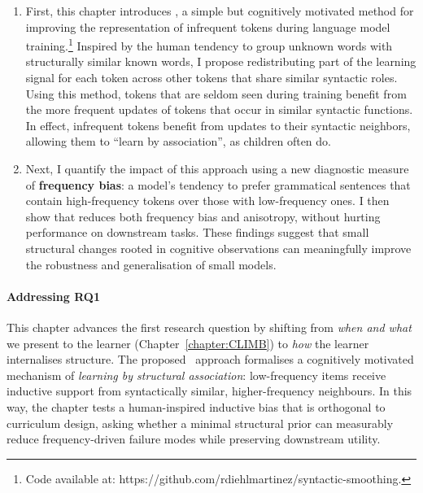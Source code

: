 \begin{enumerate}
    \item First, this chapter introduces \smoothing, a simple but cognitively motivated method for improving the representation of infrequent tokens during language model training.\footnote{Code available at: https://github.com/rdiehlmartinez/syntactic-smoothing.} Inspired by the human tendency to group unknown words with structurally similar known words, I propose redistributing part of the learning signal for each token across other tokens that share similar syntactic roles. Using this method, tokens that are seldom seen during training benefit from the more frequent updates of tokens that occur in similar syntactic functions.  In effect, infrequent tokens benefit from updates to their syntactic neighbors, allowing them to ``learn by association'', as children often do.
    \item Next, I quantify the impact of this approach using a new diagnostic measure of \textbf{frequency bias}: a model's tendency to prefer grammatical sentences that contain high-frequency tokens over those with low-frequency ones. I then show that \smoothing reduces both frequency bias and anisotropy, without hurting performance on downstream tasks. These findings suggest that small structural changes rooted in cognitive observations can meaningfully improve the robustness and generalisation of small models.
     
\end{enumerate}

\paragraph{Addressing RQ1} This chapter advances the first research question by shifting from \emph{when and what} we present to the learner (Chapter~\ref{chapter:CLIMB}) to \emph{how} the learner internalises structure. The proposed \smoothing\ approach formalises a cognitively motivated mechanism of \emph{learning by structural association}: low-frequency items receive inductive support from syntactically similar, higher-frequency neighbours. In this way, the chapter tests a human-inspired inductive bias that is orthogonal to curriculum design, asking whether a minimal structural prior can measurably reduce frequency-driven failure modes while preserving downstream utility.


\vspace{1em}

